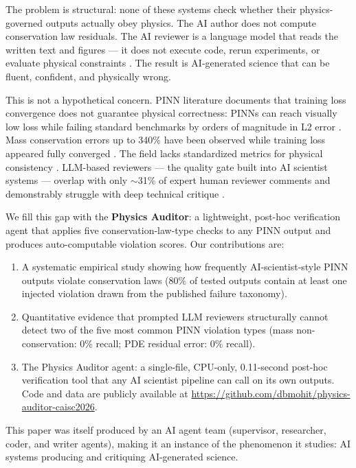 \documentclass{article}
\begin{document}
The problem is structural: none of these systems check whether their
physics-governed outputs actually obey physics.
The AI author does not compute conservation law residuals.
The AI reviewer is a language model that reads the written text and figures
--- it does not execute code, rerun experiments, or evaluate physical
constraints \citep{Lu2024AIScientist}.
The result is AI-generated science that can be fluent, confident, and
physically wrong.

This is not a hypothetical concern.
PINN literature documents that training loss convergence does not guarantee
physical correctness: PINNs can reach visually low loss while failing standard
benchmarks by orders of magnitude in L2 error \citep{Rathore2024Challenges}.
Mass conservation errors up to 340\% have been observed while training loss
appeared fully converged \citep{Krishnapriyan2021Failures}.
The field lacks standardized metrics for physical consistency
\citep{Karniadakis2021Review}.
LLM-based reviewers --- the quality gate built into AI scientist systems ---
overlap with only $\sim$31\% of expert human reviewer comments and
demonstrably struggle with deep technical critique \citep{Liang2024LLMReview}.

We fill this gap with the \textbf{Physics Auditor}: a lightweight, post-hoc
verification agent that applies five conservation-law-type checks to any PINN
output and produces auto-computable violation scores.
Our contributions are:
\begin{enumerate}
  \item A systematic empirical study showing how frequently AI-scientist-style
    PINN outputs violate conservation laws (80\% of tested outputs contain at
    least one injected violation drawn from the published failure taxonomy).
  \item Quantitative evidence that prompted LLM reviewers structurally cannot
    detect two of the five most common PINN violation types
    (mass non-conservation: 0\% recall; PDE residual error: 0\% recall).
  \item The Physics Auditor agent: a single-file, CPU-only, 0.11-second
    post-hoc verification tool that any AI scientist pipeline can call on its
    own outputs. Code and data are publicly available at
    \url{https://github.com/dbmohit/physics-auditor-caisc2026}.
\end{enumerate}

This paper was itself produced by an AI agent team
(supervisor, researcher, coder, and writer agents), making it an instance
of the phenomenon it studies: AI systems producing and critiquing
AI-generated science.
\end{document}
